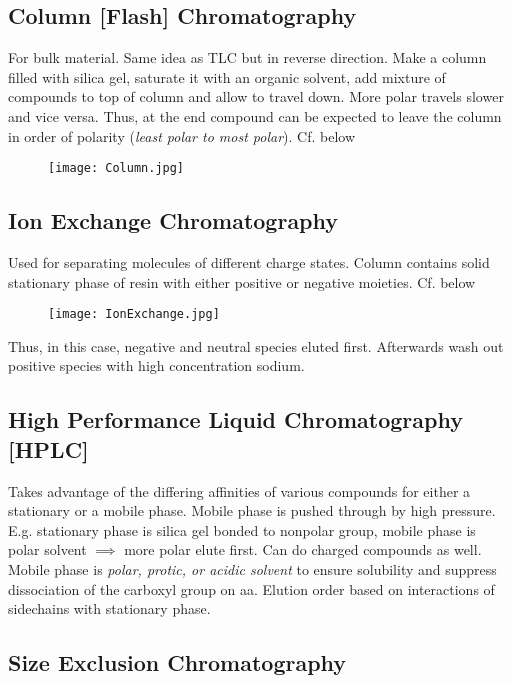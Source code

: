 \documentclass[../OChemReview.tex]{subfiles}
\begin{document}
	\subsection{Column [Flash] Chromatography}
	
	For bulk material. Same idea as TLC but in reverse direction. Make a column filled with silica gel, saturate it with an organic solvent, add mixture of compounds to top of column and allow to travel down. More polar travels slower and vice versa. Thus, at the end compound can be expected to leave the column in order of polarity (\emph{least polar to most polar}). Cf. below
	
	\begin{figure}[h]
		\centering
		\texttt{[image: Column.jpg]}
	\end{figure}
	
	\subsection{Ion Exchange Chromatography}
	
	Used for separating molecules of different charge states. Column contains solid stationary phase of resin with either positive or negative moieties. Cf. below
	
	\begin{figure}[h]
		\centering
		\texttt{[image: IonExchange.jpg]}
	\end{figure}
	
	Thus, in this case, negative and neutral species eluted first. Afterwards wash out positive species with high concentration sodium.
	
	\subsection{High Performance Liquid Chromatography [HPLC]}
	
	Takes advantage of the differing affinities of various compounds for either a stationary or a mobile phase. Mobile phase is pushed through by high pressure. E.g. stationary phase is silica gel bonded to nonpolar group, mobile phase is polar solvent $ \implies $ more polar elute first. Can do charged compounds as well. Mobile phase is \emph{polar, protic, or acidic solvent} to ensure solubility and suppress dissociation of the carboxyl group on aa. Elution order based on interactions of sidechains with stationary phase.
	
	\subsection{Size Exclusion Chromatography}
	
\end{document}
